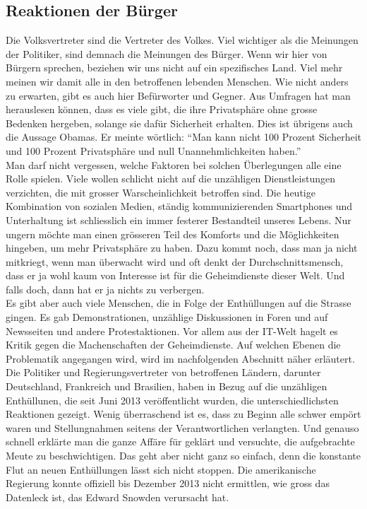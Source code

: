 \subsection{Reaktionen der Bürger}
Die Volksvertreter sind die Vertreter des Volkes. Viel wichtiger als die Meinungen der Politiker, sind demnach die Meinungen des Bürger. Wenn wir hier von Bürgern sprechen, beziehen wir uns nicht auf ein spezifisches Land. Viel mehr meinen wir damit alle in den betroffenen lebenden Menschen. Wie nicht anders zu erwarten, gibt es auch hier Befürworter und Gegner. Aus Umfragen hat man herauslesen können, dass es viele gibt, die ihre Privatsphäre ohne grosse Bedenken hergeben, solange sie dafür Sicherheit erhalten. Dies ist übrigens auch die Aussage Obamas. Er meinte wörtlich: ``Man kann nicht 100 Prozent Sicherheit und 100 Prozent Privatsphäre und null Unannehmlichkeiten haben.''
\\
Man darf nicht vergessen, welche Faktoren bei solchen Überlegungen alle eine Rolle spielen. Viele wollen schlicht nicht auf die unzähligen Dienstleistungen verzichten, die mit grosser Warscheinlichkeit betroffen sind. Die heutige Kombination von sozialen Medien, ständig kommunizierenden Smartphones und Unterhaltung ist schliesslich ein immer festerer Bestandteil unseres Lebens. Nur ungern möchte man einen grösseren Teil des Komforts und die Möglichkeiten hingeben, um mehr Privatsphäre zu haben. Dazu kommt noch, dass man ja nicht mitkriegt, wenn man überwacht wird und oft denkt der Durchschnittsmensch, dass er ja wohl kaum von Interesse ist für die Geheimdienste dieser Welt. Und falls doch, dann hat er ja nichts zu verbergen.
\\
Es gibt aber auch viele Menschen, die in Folge der Enthüllungen auf die Strasse gingen. Es gab Demonstrationen, unzählige Diskussionen in Foren und auf Newsseiten und andere Protestaktionen. Vor allem aus der IT-Welt hagelt es Kritik gegen die Machenschaften der Geheimdienste. Auf welchen Ebenen die Problematik angegangen wird, wird im nachfolgenden Abschnitt näher erläutert.
Die Politiker und Regierungsvertreter von betroffenen Ländern, darunter Deutschland, Frankreich und Brasilien, haben in Bezug auf die unzähligen Enthüllunen, die seit Juni 2013 veröffentlicht wurden, die unterschiedlichsten Reaktionen gezeigt. Wenig überraschend ist es, dass zu Beginn alle schwer empört waren und Stellungnahmen seitens der Verantwortlichen verlangten. Und genauso schnell erklärte man die ganze Affäre für geklärt und versuchte, die aufgebrachte Meute zu beschwichtigen. Das geht aber nicht ganz so einfach, denn die konstante Flut an neuen Enthüllungen lässt sich nicht stoppen. Die amerikanische Regierung konnte offiziell bis Dezember 2013 nicht ermittlen, wie gross das Datenleck ist, das Edward Snowden verursacht hat.
